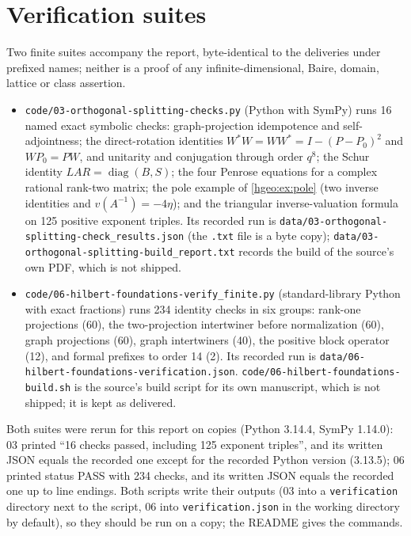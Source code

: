 \documentclass[11pt,letterpaper]{article}
\numberwithin{equation}{section}
\theoremstyle{definition}
\theoremstyle{remark}
\newcommand{\diag}{\operatorname{diag}}
\newcommand{\fn}[1]{\nolinkurl{#1}}
\begin{document}
\section{Verification suites}\label{hgeo:app:verification}
Two finite suites accompany the report, byte-identical to the deliveries
under prefixed names; neither is a proof of any infinite-dimensional, Baire,
domain, lattice or class assertion.
\begin{itemize}[leftmargin=*]
\item \fn{code/03-orthogonal-splitting-checks.py} (Python with SymPy) runs 16
named exact symbolic checks: graph-projection idempotence and self-adjointness;
the direct-rotation identities $W^*W=WW^*=I-(P-P_0)^2$ and $WP_0=PW$, and
unitarity and conjugation through order $q^8$; the Schur identity
$LAR=\diag(B,S)$; the four Penrose equations for a complex rational rank-two
matrix; the pole example of \cref{hgeo:ex:pole} (two inverse identities and
$v(A^{-1})=-4\eta$); and the triangular inverse-valuation formula on 125
positive exponent triples. Its recorded run is
\fn{data/03-orthogonal-splitting-check_results.json} (the \texttt{.txt}
file is a byte copy); \fn{data/03-orthogonal-splitting-build_report.txt}
records the build of the source's own PDF, which is not shipped.
\item \fn{code/06-hilbert-foundations-verify_finite.py} (standard-library
Python with exact fractions) runs 234 identity checks in six groups: rank-one
projections (60), the two-projection intertwiner before normalization (60),
graph projections (60), graph intertwiners (40), the positive block operator
(12), and formal prefixes to order 14 (2). Its recorded run is
\fn{data/06-hilbert-foundations-verification.json}.
\fn{code/06-hilbert-foundations-build.sh} is the source's build script for
its own manuscript, which is not shipped; it is kept as delivered.
\end{itemize}
Both suites were rerun for this report on copies (Python 3.14.4, SymPy
1.14.0): 03 printed ``16 checks passed, including 125 exponent triples'', and
its written JSON equals the recorded one except for the recorded Python
version (3.13.5); 06 printed status PASS with 234 checks, and its written JSON
equals the recorded one up to line endings. Both scripts write their outputs
(03 into a \fn{verification} directory next to the script, 06 into
\fn{verification.json} in the working directory by default), so they should
be run on a copy; the README gives the commands.
\end{document}
